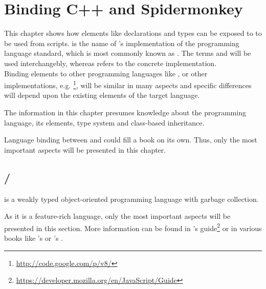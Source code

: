 \chapter{Binding C++ and Spidermonkey}
\label{chap:LanguageBindingCPPJS}

This chapter shows how  elements like declarations and types can be exposed to  to be used from scripts.  is the name of 's implementation of the  programming language standard, which is most commonly known as . The terms  and  will be used interchangebly, whereas  refers to the concrete  implementation.\\
Binding  elements to other programming languages like ,  or other  implementations, e.g. \footnote{\url{http://code.google.com/p/v8/}}, will be similar in many aspects and specific differences will depend upon the existing elements of the target language.

The information in this chapter presumes knowledge about the  programming language, its elements, type system and class-based inheritance.

Language binding between  and  could fill a book on its own. Thus, only the most important aspects will be presented in this chapter.

\section{/}
\label{sec:JavaScript}

 is a weakly typed object-oriented programming language with garbage collection. 

As it is a feature-rich language, only the most important aspects will be presented in this section. More information can be found in 's  guide\footnote{\url{https://developer.mozilla.org/en/JavaScript/Guide}} or in various books like 's  or 's .

